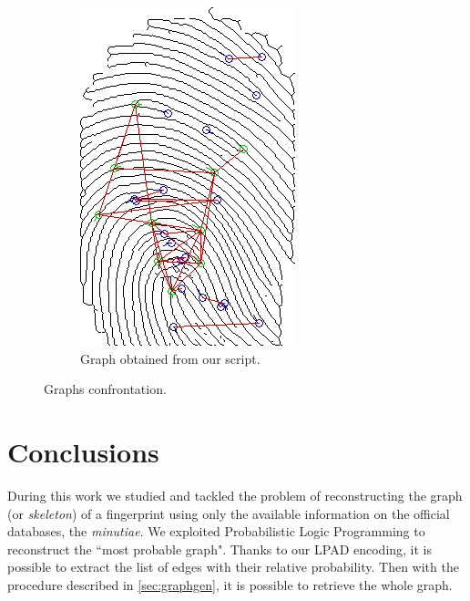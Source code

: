 \documentclass[8pt]{article}
\begin{document}
\begin{figure}
\begin{subfigure}{.38\textwidth}
		\includegraphics[width=0.86\linewidth]{img/plp-final}
		\caption{Graph obtained from our script.}
			\label{fig:concl-plp}
	\end{subfigure}%
	\caption{Graphs confrontation.}
	\label{fig:concl}
\end{figure}




\section{Conclusions}
During this work we studied and tackled the problem of reconstructing the graph
(or \emph{skeleton}) of a fingerprint using only the available information on
the official databases, \ie the \emph{minutiae}.  We exploited Probabilistic
Logic Programming to reconstruct the \textquotedblleft most probable graph".
Thanks to our LPAD encoding, it is possible to extract the list of edges with
their relative probability.  Then with the procedure described in
\cref{sec:graphgen}, it is possible to retrieve the whole graph.
\end{document}
